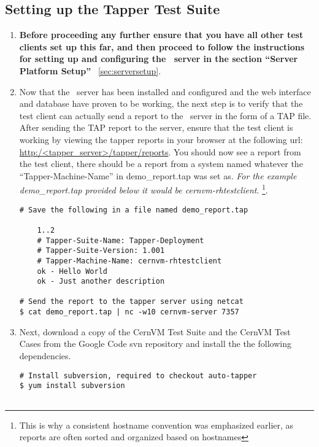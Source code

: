 \subsection{Setting up the Tapper Test Suite}
\label{sec:debiantestsuite}
\begin{enumerate}
\item 	{\bf Before proceeding any further ensure that you have all other test clients set up this far, and then proceed
		to follow the instructions for setting up and configuring the \tapper~server in the section ``Server Platform Setup''}		
		~\ref{sec:serversetup}.
		
\item 	Now that the \tapper~server has been installed and configured and the \tapper web interface and database have proven
		to be working, the next step is to verify that the test client can actually send a report to the \tapper~server in
		the form of a TAP file. After sending the TAP report to the server, ensure that the test client is working by viewing 
		the tapper reports in your browser at the following url: \url{http:/<tapper\_server>/tapper/reports}. You should now see a 
		report from the test client, there should be a report from a system named whatever the ``Tapper-Machine-Name'' in 
		demo\_report.tap was set as. \emph{For the example demo\_report.tap provided below it would be cernvm-rhtestclient}.
		\footnote{This is why a consistent hostname convention was emphasized earlier, as reports are often sorted and organized 
		based on hostnames}.
		
\lstset{language=bash,caption=Send a Basic Report to the \tapper~Server}
\begin{lstlisting}
# Save the following in a file named demo_report.tap

	1..2
	# Tapper-Suite-Name: Tapper-Deployment
	# Tapper-Suite-Version: 1.001
	# Tapper-Machine-Name: cernvm-rhtestclient
	ok - Hello World
	ok - Just another description

# Send the report to the tapper server using netcat
$ cat demo_report.tap | nc -w10 cernvm-server 7357
\end{lstlisting}

\item 	Next, download a copy of the CernVM Test Suite and the CernVM Test Cases from the Google Code svn repository
		\cite{GCreleasetesting} and install the the following dependencies.
		
\lstset{language=bash,caption=Install CernVM Test Suite and Dependencies}
\begin{lstlisting}
# Install subversion, required to checkout auto-tapper
$ yum install subversion


\end{lstlisting}
\end{enumerate}
